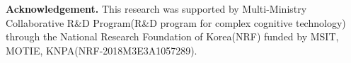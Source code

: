 \documentclass{article}
\begin{document}
\vspace*{\fill}
\noindent\footnotesize\textbf{Acknowledgement. }This research was supported by Multi-Ministry Collaborative R\&D Program(R\&D program for complex cognitive technology) through the National Research Foundation of Korea(NRF) funded by MSIT, MOTIE, KNPA(NRF-2018M3E3A1057289).





\clearpage

\small 
\end{document}
